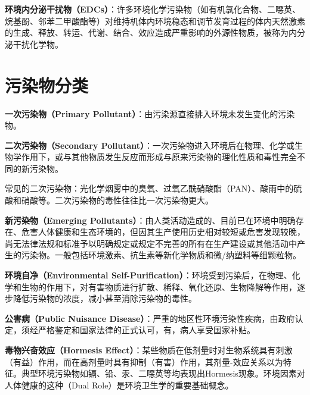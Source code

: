 \documentclass[10pt,a4paper,oneside]{ctexbook}
\begin{document}
\begin{defbox}
\textbf{环境内分泌干扰物（EDCs）}：许多环境化学污染物（如有机氯化合物、二噁英、烷基酚、邻苯二甲酸酯等）对维持机体内环境稳态和调节发育过程的体内天然激素的生成、释放、转运、代谢、结合、效应造成严重影响的外源性物质，被称为内分泌干扰化学物。
\end{defbox}

\section{污染物分类}

\begin{defbox}
\textbf{一次污染物（Primary Pollutant）}：由污染源直接排入环境未发生变化的污染物。
\end{defbox}

\begin{defbox}
\textbf{二次污染物（Secondary Pollutant）}：一次污染物进入环境后在物理、化学或生物学作用下，或与其他物质发生反应而形成与原来污染物的理化性质和毒性完全不同的新污染物。
\end{defbox}

\begin{keybox}
常见的二次污染物：光化学烟雾中的臭氧、过氧乙酰硝酸酯（PAN）、酸雨中的硫酸和硝酸等。二次污染物的毒性往往比一次污染物更大。
\end{keybox}

\begin{defbox}
\textbf{新污染物（Emerging Pollutants）}：由人类活动造成的、目前已在环境中明确存在、危害人体健康和生态环境的，但因其生产使用历史相对较短或危害发现较晚，尚无法律法规和标准予以明确规定或规定不完善的所有在生产建设或其他活动中产生的污染物。一般包括环境激素、抗生素等新化学物质和微/纳塑料等细颗粒物。

\textbf{环境自净（Environmental Self-Purification）}：环境受到污染后，在物理、化学和生物的作用下，对有害物质进行扩散、稀释、氧化还原、生物降解等作用，逐步降低污染物的浓度，减小甚至消除污染物的毒性。

\textbf{公害病（Public Nuisance Disease）}：严重的地区性环境污染性疾病，由政府认定，须经严格鉴定和国家法律的正式认可，有，病人享受国家补贴。

\textbf{毒物兴奋效应（Hormesis Effect）}：某些物质在低剂量时对生物系统具有刺激（有益）作用，而在高剂量时具有抑制（有害）作用，其剂量-效应关系以为特征。典型环境污染物如镉、铅、汞、二噁英等均表现出Hormesis现象。环境因素对人体健康的这种（Dual Role）是环境卫生学的重要基础概念。
\end{defbox}
\end{document}
